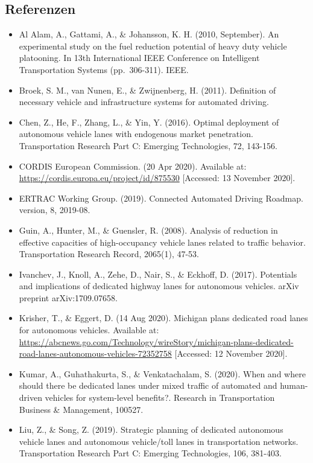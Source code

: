 \documentclass[
]{book}
\providecommand{\tightlist}{%
  \setlength{\itemsep}{0pt}\setlength{\parskip}{0pt}}
\begin{document}
\hypertarget{referenzen}{%
\subsection*{Referenzen}\label{referenzen}}

\begin{itemize}
\tightlist
\item
  Al Alam, A., Gattami, A., \& Johansson, K. H. (2010, September). An experimental study on the fuel reduction potential of heavy duty vehicle platooning. In 13th International IEEE Conference on Intelligent Transportation Systems (pp.~306-311). IEEE.
\item
  Broek, S. M., van Nunen, E., \& Zwijnenberg, H. (2011). Definition of necessary vehicle and infrastructure systems for automated driving.
\item
  Chen, Z., He, F., Zhang, L., \& Yin, Y. (2016). Optimal deployment of autonomous vehicle lanes with endogenous market penetration. Transportation Research Part C: Emerging Technologies, 72, 143-156.
\item
  CORDIS \textbar{} European Commission. (20 Apr 2020). Available at: \url{https://cordis.europa.eu/project/id/875530} {[}Accessed: 13 November 2020{]}.
\item
  ERTRAC Working Group. (2019). Connected Automated Driving Roadmap. version, 8, 2019-08.
\item
  Guin, A., Hunter, M., \& Guensler, R. (2008). Analysis of reduction in effective capacities of high-occupancy vehicle lanes related to traffic behavior. Transportation Research Record, 2065(1), 47-53.
\item
  Ivanchev, J., Knoll, A., Zehe, D., Nair, S., \& Eckhoff, D. (2017). Potentials and implications of dedicated highway lanes for autonomous vehicles. arXiv preprint arXiv:1709.07658.
\item
  Krisher, T., \& Eggert, D. (14 Aug 2020). Michigan plans dedicated road lanes for autonomous vehicles. Available at: \url{https://abcnews.go.com/Technology/wireStory/michigan-plans-dedicated-road-lanes-autonomous-vehicles-72352758} {[}Accessed: 12 November 2020{]}.
\item
  Kumar, A., Guhathakurta, S., \& Venkatachalam, S. (2020). When and where should there be dedicated lanes under mixed traffic of automated and human-driven vehicles for system-level benefits?. Research in Transportation Business \& Management, 100527.
\item
  Liu, Z., \& Song, Z. (2019). Strategic planning of dedicated autonomous vehicle lanes and autonomous vehicle/toll lanes in transportation networks. Transportation Research Part C: Emerging Technologies, 106, 381-403.

\end{itemize}
\end{document}
